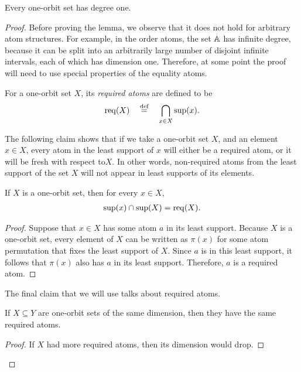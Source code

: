 \begin{lemma}\label{lem:one-orbit-one-degree}
    Every one-orbit set has degree one. 
\end{lemma}
\begin{proof}
Before proving the lemma, we observe that it does not hold for arbitrary atom structures. For example, in the order atoms, the set $\mathbb A$ has infinite degree, because it can be split into an arbitrarily large number of disjoint infinite intervals, each of which has dimension one.
Therefore, at some point the proof will need to use special properties of the equality atoms. 

\begin{definition}
	For a one-orbit set $X$, its \emph{required atoms} are defined to be
	\begin{align*}
		\operatorname{req}(X)
		\quad \stackrel{\text{def}}= \quad
		\bigcap_{x \in X} \sup(x).
	\end{align*}
\end{definition}

The following claim shows that if we take a one-orbit set $X$, and an element $x \in X$, every atom in the least support of $x$ will either be a required atom, or it will be fresh with respect to$ X$. In other words, non-required atoms from the least support of the set $X$ will not appear in least supports of its elements.
\begin{claim}\label{claim:one-orbit-required}
	If $X$ is a one-orbit set, then for every $x \in X$,
	\begin{align*}
		\sup(x) \cap \sup(X) = \operatorname{req}(X).
	\end{align*}
\end{claim}
\begin{proof}
	Suppose that $x \in X$ has some atom $a$ in its least support. Because $X$ is a one-orbit set, every element of $X$ can be written as  $\pi(x)$ for some atom permutation that fixes the least support of $X$. Since $a$ is in this least support, it follows that $\pi(x)$ also has $a$ in its least support. Therefore, $a$ is a required atom.
\end{proof}

The final claim that we will use talks about required atoms.

\begin{claim}\label{claim:one-orbit-required-same-dimension}
    If $X \subseteq Y$ are one-orbit sets of the same dimension, then they have the same required atoms. 
\end{claim}
\begin{proof}
    If $X$ had more required atoms, then its dimension would drop.
\end{proof}


\end{proof}
